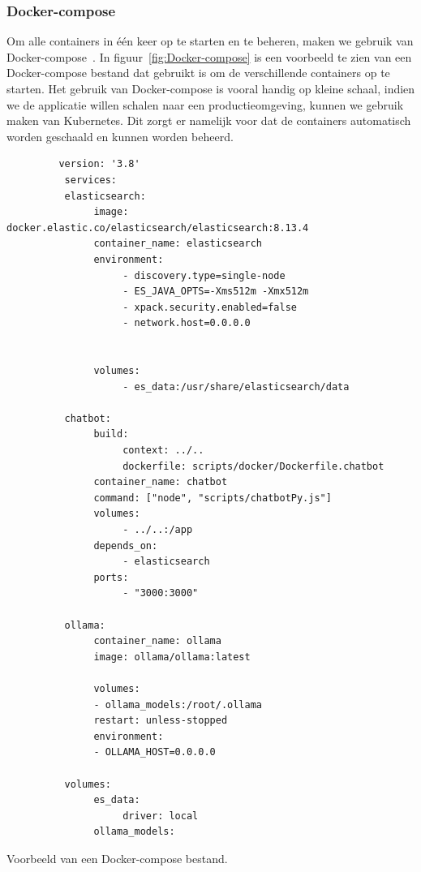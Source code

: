 \subsubsection{Docker-compose}
Om alle containers in één keer op te starten en te beheren, maken we gebruik van Docker-compose~\autocite{docker2025}.
In figuur~\ref{fig:Docker-compose} is een voorbeeld te zien van een Docker-compose bestand dat gebruikt is om de verschillende containers op te starten.
Het gebruik van Docker-compose is vooral handig op kleine schaal, indien we de applicatie willen schalen naar een productieomgeving, kunnen we gebruik maken van Kubernetes.
Dit zorgt er namelijk voor dat de containers automatisch worden geschaald en kunnen worden beheerd.

\begin{listing}[H]
     \begin{verbatim}
         version: '3.8'
          services:
          elasticsearch:
               image: docker.elastic.co/elasticsearch/elasticsearch:8.13.4
               container_name: elasticsearch
               environment:
                    - discovery.type=single-node
                    - ES_JAVA_OPTS=-Xms512m -Xmx512m
                    - xpack.security.enabled=false
                    - network.host=0.0.0.0
               
               
               volumes:
                    - es_data:/usr/share/elasticsearch/data

          chatbot:
               build:
                    context: ../..
                    dockerfile: scripts/docker/Dockerfile.chatbot
               container_name: chatbot
               command: ["node", "scripts/chatbotPy.js"]
               volumes:
                    - ../..:/app
               depends_on:
                    - elasticsearch
               ports:
                    - "3000:3000"

          ollama:
               container_name: ollama
               image: ollama/ollama:latest
               
               volumes:
               - ollama_models:/root/.ollama
               restart: unless-stopped
               environment:
               - OLLAMA_HOST=0.0.0.0

          volumes:
               es_data:
                    driver: local
               ollama_models:
     \end{verbatim}
     \caption[Voorbeeld Docker-compose]{\label{fig:Docker-compose}Voorbeeld van een Docker-compose bestand.}
\end{listing}
